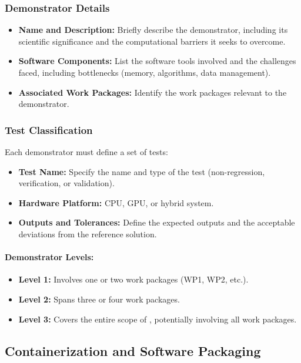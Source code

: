 \subsubsection{Demonstrator Details}
\begin{itemize}
    \item \textbf{Name and Description:} Briefly describe the demonstrator, including its scientific significance and the computational barriers it seeks to overcome.
    \item \textbf{Software Components:} List the software tools involved and the challenges faced, including bottlenecks (memory, algorithms, data management).
    \item \textbf{Associated Work Packages:} Identify the work packages relevant to the demonstrator.
\end{itemize}

\subsubsection{Test Classification}
Each demonstrator must define a set of tests:
\begin{itemize}
    \item \textbf{Test Name:} Specify the name and type of the test (non-regression, verification, or validation).
    \item \textbf{Hardware Platform:} CPU, GPU, or hybrid system.
    \item \textbf{Outputs and Tolerances:} Define the expected outputs and the acceptable deviations from the reference solution.
\end{itemize}

\paragraph{Demonstrator Levels:}
\begin{itemize}
    \item \textbf{Level 1:} Involves one or two work packages (WP1, WP2, etc.).
    \item \textbf{Level 2:} Spans three or four work packages.
    \item \textbf{Level 3:} Covers the entire scope of \exama, potentially involving all work packages.
\end{itemize}

\subsection{Containerization and Software Packaging}
\label{sec:containerization}

